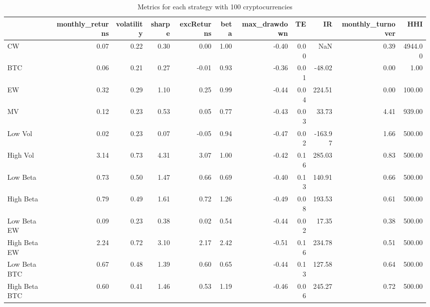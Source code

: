 \begin{table}
\centering
\caption{Metrics for each strategy with 100 cryptocurrencies}
\label{metrics100}
\begin{tabular}{lrrrrrrrrrr}
\toprule
{} &  monthly\_returns &  volatility &  sharpe &  excReturns &  beta &  max\_drawdown &   TE &      IR &  monthly\_turnover &     HHI \\
\midrule
CW            &             0.07 &        0.22 &    0.30 &        0.00 &  1.00 &         -0.40 & 0.00 &     NaN &              0.39 & 4944.00 \\
BTC           &             0.06 &        0.21 &    0.27 &       -0.01 &  0.93 &         -0.36 & 0.01 &  -48.02 &              0.00 &    1.00 \\
EW            &             0.32 &        0.29 &    1.10 &        0.25 &  0.99 &         -0.44 & 0.04 &  224.51 &              0.00 &  100.00 \\
MV            &             0.12 &        0.23 &    0.53 &        0.05 &  0.77 &         -0.43 & 0.03 &   33.73 &              4.41 &  939.00 \\
Low Vol       &             0.02 &        0.23 &    0.07 &       -0.05 &  0.94 &         -0.47 & 0.02 & -163.97 &              1.66 &  500.00 \\
High Vol      &             3.14 &        0.73 &    4.31 &        3.07 &  1.00 &         -0.42 & 0.16 &  285.03 &              0.83 &  500.00 \\
Low Beta      &             0.73 &        0.50 &    1.47 &        0.66 &  0.69 &         -0.40 & 0.13 &  140.91 &              0.66 &  500.00 \\
High Beta     &             0.79 &        0.49 &    1.61 &        0.72 &  1.26 &         -0.49 & 0.08 &  193.53 &              0.61 &  500.00 \\
Low Beta EW   &             0.09 &        0.23 &    0.38 &        0.02 &  0.54 &         -0.44 & 0.02 &   17.35 &              0.38 &  500.00 \\
High Beta EW  &             2.24 &        0.72 &    3.10 &        2.17 &  2.42 &         -0.51 & 0.16 &  234.78 &              0.51 &  500.00 \\
Low Beta BTC  &             0.67 &        0.48 &    1.39 &        0.60 &  0.65 &         -0.44 & 0.13 &  127.58 &              0.64 &  500.00 \\
High Beta BTC &             0.60 &        0.41 &    1.46 &        0.53 &  1.19 &         -0.46 & 0.06 &  245.27 &              0.72 &  500.00 \\
\bottomrule
\end{tabular}
\end{table}
